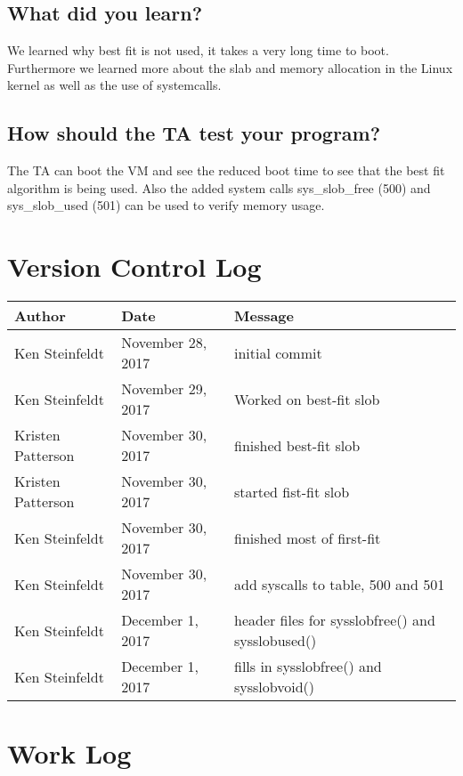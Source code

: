\documentclass[10pt,letterpaper,onecolumn,draftclsnofoot]{IEEEtran}
\begin{document}
\subsection{What did you learn?}
We learned why best fit is not used, it takes a very long time to boot.
Furthermore we learned more about the slab and memory allocation in the Linux kernel as well as the use of systemcalls.

\subsection{How should the TA test your program?}
The TA can boot the VM and see the reduced boot time to see that the best fit algorithm is being used.
Also the added system calls sys_slob_free (500) and sys_slob_used (501) can be used to verify memory usage.

\section{Version Control Log}

\begin{center}
	\begin{tabular}{|l|l|l|}
		\hline
		\textbf{Author} & \textbf{Date} & \textbf{Message} \\ \hline
		Ken Steinfeldt & November 28, 2017 & initial commit \\ \hline
		Ken Steinfeldt & November 29, 2017 & Worked on best-fit slob \\ \hline
		Kristen Patterson & November 30, 2017 & finished best-fit slob \\ \hline
		Kristen Patterson & November 30, 2017 & started fist-fit slob \\ \hline
		Ken Steinfeldt & November 30, 2017 & finished most of first-fit \\ \hline
		Ken Steinfeldt & November 30, 2017 & add syscalls to table, 500 and 501 \\ \hline
		Ken Steinfeldt & December 1, 2017 & header files for sysslobfree() and sysslobused() \\ \hline
		Ken Steinfeldt & December 1, 2017 & fills in sysslobfree() and sysslobvoid() \\ \hline
	\end{tabular}
\end{center}

\section{Work Log}
\end{document}
